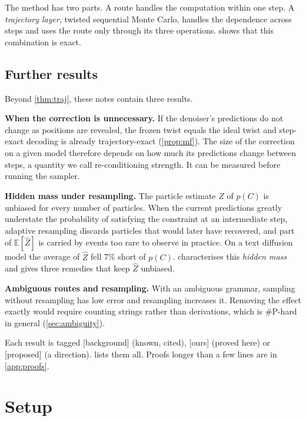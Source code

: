 \documentclass[11pt]{article}
\theoremstyle{definition}
\newcommand{\E}{\mathbb{E}}
\newcommand{\Zh}{\widehat Z}
\newcommand{\status}[1]{\textsf{\small[#1]}}
\begin{document}
The method has two parts. A route handles the computation within one step. A \emph{trajectory layer}, twisted
sequential Monte Carlo, handles the dependence across steps and uses the route only through its three
operations.  shows that this combination is exact.

\subsection{Further results}
Beyond \cref{thm:traj}, these notes contain three results.

\textbf{When the correction is unnecessary.} If the denoiser's predictions do not change as positions are
revealed, the frozen twist equals the ideal twist and step-exact decoding is already trajectory-exact
(\cref{prop:mf}). The size of the correction on a given model therefore depends on how much its predictions change
between steps, a quantity we call re-conditioning strength. It can be measured before running the sampler.

\textbf{Hidden mass under resampling.} The particle estimate $\Zh$ of $p(C)$ is unbiased for every number of
particles. When the current predictions greatly understate the probability of satisfying the constraint at an
intermediate step, adaptive resampling discards particles that would later have recovered, and part of $\E[\Zh]$
is carried by events too rare to observe in practice. On a text diffusion model the average of $\Zh$ fell 7\%
short of $p(C)$.  characterises this \emph{hidden mass} and gives three remedies that keep
$\Zh$ unbiased.

\textbf{Ambiguous routes and resampling.} With an ambiguous grammar, sampling without resampling has low error and
resampling increases it. Removing the effect exactly would require counting strings rather than derivations,
which is \#P-hard in general (\cref{sec:ambiguity}).

Each result is tagged \status{background} (known, cited), \status{ours} (proved here) or \status{proposed} (a
direction).  lists them all. Proofs longer than a few lines are in \cref{app:proofs}.

\section{Setup}\label{sec:setup}
\end{document}
